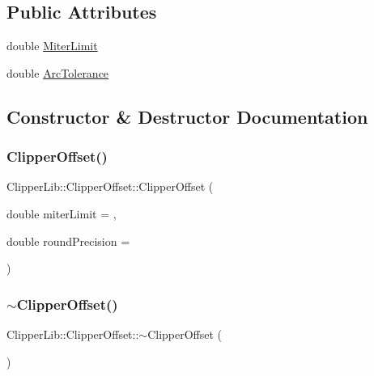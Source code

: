 \subsection*{Public Attributes}
\begin{DoxyCompactItemize}
\item 
double \mbox{\hyperlink{class_clipper_lib_1_1_clipper_offset_a36b3bf4571e5b831edd584cbcb179246}{Miter\+Limit}}
\item 
double \mbox{\hyperlink{class_clipper_lib_1_1_clipper_offset_a6c1735720b06e6b92dc25891014b2a92}{Arc\+Tolerance}}
\end{DoxyCompactItemize}


\subsection{Constructor \& Destructor Documentation}
\mbox{\label{class_clipper_lib_1_1_clipper_offset_a45b4750989901db0c3865c374abdfcdc}} 
\subsubsection{\texorpdfstring{ClipperOffset()}{ClipperOffset()}}
{\footnotesize\ttfamily Clipper\+Lib\+::\+Clipper\+Offset\+::\+Clipper\+Offset (\begin{DoxyParamCaption}\item[{double}]{miter\+Limit = {},  }\item[{double}]{round\+Precision = {} }\end{DoxyParamCaption})}

\mbox{\label{class_clipper_lib_1_1_clipper_offset_a05b2d8d13e1148db74b681203a6ea76d}} 
\subsubsection{\texorpdfstring{$\sim$ClipperOffset()}{~ClipperOffset()}}
{\footnotesize\ttfamily Clipper\+Lib\+::\+Clipper\+Offset\+::$\sim$\+Clipper\+Offset (\begin{DoxyParamCaption}{ }\end{DoxyParamCaption})}



